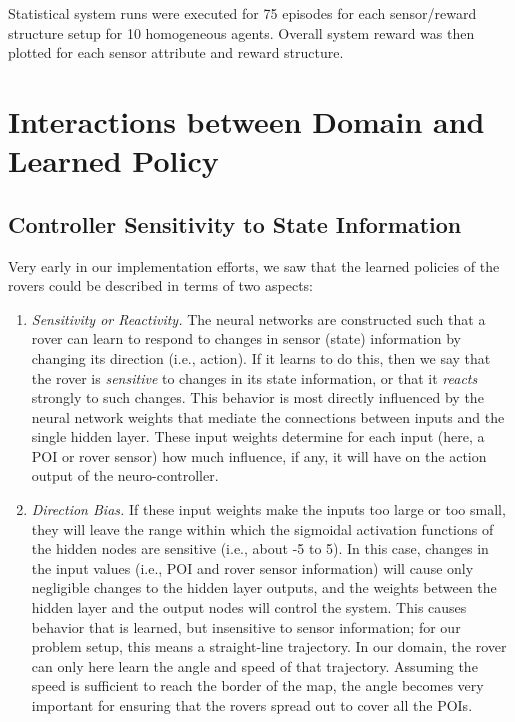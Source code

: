 \documentclass[letterpaper, 10 pt, conference]{ieeeconf}  %
\begin{document}
Statistical system runs were executed for 75 episodes for each
sensor/reward structure setup for 10 homogeneous agents.  Overall system reward was then plotted for each
sensor attribute and reward structure.


\section{Interactions between Domain and Learned Policy}
\subsection{Controller Sensitivity to State Information}
Very early in our implementation efforts, we saw that the learned policies of the rovers could be described in terms of two aspects:

\begin{enumerate}
\item \emph{Sensitivity or Reactivity.} The neural networks are constructed such that a rover can learn to respond to changes in sensor (state) information by changing its direction (i.e., action). If it learns to do this, then we say that the rover is \emph{sensitive} to changes in its state information, or that it \emph{reacts} strongly to such changes. This behavior is most directly influenced by the neural network weights that mediate the connections between inputs and the single hidden layer. These input weights determine for each input (here, a POI or rover sensor) how much influence, if any, it will have on the action output of the neuro-controller. 

\item \emph{Direction Bias.} If these input weights make the inputs too large or too small, they will leave the range within which the sigmoidal activation functions of the hidden nodes are sensitive (i.e., about -5 to 5). In this case, changes in the input values (i.e., POI and rover sensor information) will cause only negligible changes to the hidden layer outputs, and the weights between the hidden layer and the output nodes will control the system. This causes behavior that is learned, but insensitive to sensor information; for our problem setup, this means a straight-line trajectory. In our domain, the rover can only here learn the angle and speed of that trajectory. Assuming the speed is sufficient to reach the border of the map, the angle becomes very important for ensuring that the rovers spread out to cover all the POIs. 
\end{enumerate}
\end{document}
